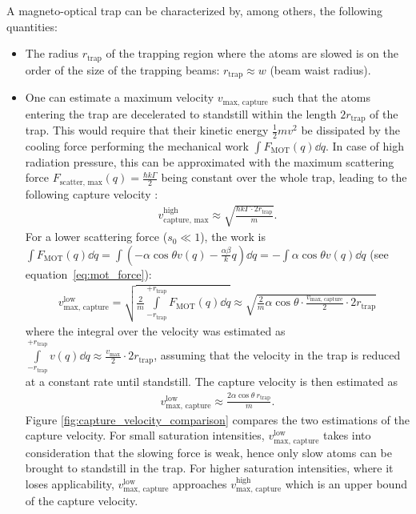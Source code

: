 A magneto-optical trap can be characterized by, among others, the following quantities:
\begin{itemize}
    \item The radius $r_\text{trap}$ of the trapping region where the atoms are slowed  is on the order of the size of the trapping beams: $r_\text{trap} \approx w$ (beam waist radius).
    \item One can estimate a maximum velocity $v_\text{max, capture}$ such that the atoms entering the trap are decelerated to standstill within the length $2r_\text{trap}$ of the trap. This would require that their kinetic energy $\frac{1}{2}mv^2$ be dissipated by the cooling force performing the mechanical work $\int F_\text{MOT}(q) \dd{q}$. In case of high radiation pressure, this can be approximated with the maximum scattering force $F_\text{scatter, max}(q) = \frac{\hbar k \Gamma}{2}$ being constant over the whole trap, leading to the following capture velocity \cite{lunden_enhancing_2020}:
    \begin{align}\label{eq:capture_velocity_high}
        v_\text{capture, max}^\text{high} \approx \sqrt{\frac{\hbar k \Gamma \cdot 2 r_\text{trap}}{m}}.
    \end{align}
     For a lower scattering force ($s_0 \ll 1$), the work is $\int F_\text{MOT}(q)\dd{q}= \int (-\alpha \cos \theta v(q) - \frac{\alpha\beta}{k}q) \dd{q} = - \int \alpha \cos \theta v(q) \dd{q}$ (see equation~\ref{eq:mot_force}):
    \begin{align}
            v_\text{max, capture}^\text{low}
            = \sqrt{\frac{2}{m} \int\limits_{-r_\text{trap}}^{+r_\text{trap}} F_\text{MOT}(q) \dd{q}} 
            \approx \sqrt{\frac{2}{m} \alpha \cos \theta \cdot \frac{v_\text{max, capture}}{2} \cdot 2r_\text{trap}}
    \end{align}
    where the integral over the velocity was estimated as $\int\limits_{-r_\text{trap}}^{+r_\text{trap}}  v(q) \dd{q} \approx \frac{v_\text{max}}{2} \cdot 2r_\text{trap}$, assuming that the velocity in the trap is reduced at a constant rate until standstill. The capture velocity is then estimated as
    \begin{align}\label{eq:capture_velocity_low}
        v_\text{max, capture}^\text{low} \approx \frac{2 \alpha \cos \theta ~ r_\text{trap}}{m}.
    \end{align}
    Figure \ref{fig:capture_velocity_comparison} compares the two estimations of the capture velocity. For small saturation intensities, $v_\text{max, capture}^\text{low}$ takes into consideration that the slowing force is weak, hence only slow atoms can be brought to standstill in the trap. For higher saturation intensities, where it loses applicability, $v_\text{max, capture}^\text{low}$ approaches $v_\text{max, capture}^\text{high}$ which is an upper bound of the capture velocity.

\end{itemize}
